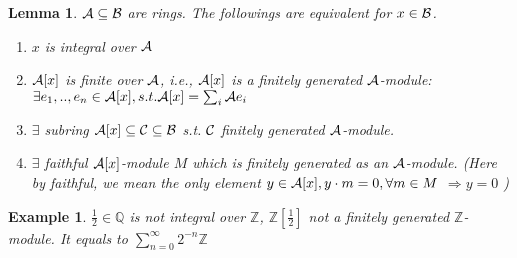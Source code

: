 \documentclass[11pt]{article}
\newtheorem{lemma}[thm]{Lemma}
\newtheorem{ex}[thm]{Example}
\newcommand{\intg}{\mathbb Z}
\newcommand{\ratl}{\mathbb Q}
\newcommand{\cala}{{\cal A}}
\newcommand{\calb}{{\cal B}}
\newcommand{\calc}{{\cal C}}
\newcommand{\Lrta}{\Longrightarrow}
\begin{document}
\begin{lemma}\label{lem:characterization_integral}
$\cala\subseteq \calb$ are rings. The followings are equivalent for $x\in\calb$.
\begin{enumerate}[label=\roman*).]
\item $x$ is integral over $\cala$
\item $\cala[x]$ is finite over $\cala$, i.e., $\cala[x]$ is a finitely generated $\cala$-module: $\exists e_1,..,e_n\in\cala[x],s.t. \cala[x]=\sum_i\cala e_i$
\item $\exists $ subring $\cala[x]\subseteq \calc\subseteq \calb$ s.t. $\calc$ finitely generated $\cala$-module.
\item $\exists$ faithful $\cala[x]$-module $M$ which is finitely generated as an $\cala$-module.
(Here by faithful, we mean the only element $y\in\cala[x], y\cdot m=0,\forall m\in M$ $\Lrta y=0$ )
\end{enumerate}
\end{lemma}
\begin{ex}
$\frac{1}{2}\in\ratl$ is not integral over $\intg$, $\intg[\frac{1}{2}]$ not a finitely generated $\intg$-module. It equals to  $\sum_{n=0}^\infty 2^{-n}\intg$
\end{ex}
\end{document}
